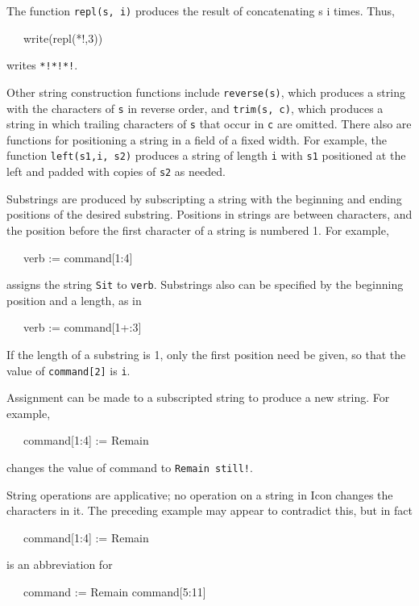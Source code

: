 The function \texttt{repl(s, i)} produces the result of concatenating
s i times. Thus,

{\ttfamily\mdseries
\ \ \ write(repl({\textquotedbl}*!{\textquotedbl},3))}

\noindent writes \texttt{*!*!*!}.


Other string construction functions include \texttt{reverse(s)}, which
produces a string with the characters of \texttt{s} in reverse order,
and \texttt{trim(s, c)}, which produces a string in which trailing
characters of \texttt{s} that occur in \texttt{c} are omitted. There
also are functions for positioning a string in a field of a fixed
width. For example, the function \texttt{left(s1,i, s2)} produces a
string of length \texttt{i} with \texttt{s1} positioned at the left
and padded with copies of \texttt{s2} as needed.

Substrings are produced by subscripting a string with the beginning
and ending positions of the desired substring.  Positions in strings
are between characters, and the position before the first character of
a string is numbered 1. For example,

{\ttfamily\mdseries
\ \ \ verb := command[1:4]}

\noindent assigns the string
\texttt{{\textquotedbl}Sit{\textquotedbl}} to
\texttt{verb}. Substrings also can be specified by the beginning
position and a length, as in

{\ttfamily\mdseries
\ \ \ verb := command[1+:3]}

If the length of a substring is 1, only the first position need be
given, so that the value of \texttt{command[2]} is
\texttt{{\textquotedbl}i{\textquotedbl}}.

Assignment can be made to a subscripted string to produce a new
string. For example,

{\ttfamily\mdseries
\ \ \ command[1:4] := {\textquotedbl}Remain{\textquotedbl}}

\noindent changes the value of command to
\texttt{{\textquotedbl}Remain still!{\textquotedbl}}.

String operations are applicative; no operation on a string in Icon
changes the characters in it. The preceding example may appear to
contradict this, but in fact

{\ttfamily\mdseries
\ \ \ command[1:4] := {\textquotedbl}Remain{\textquotedbl}}

\noindent
is an abbreviation for

{\ttfamily\mdseries
\ \ \ command := {\textquotedbl}Remain{\textquotedbl} {\textbar}{\textbar} command[5:11]}

